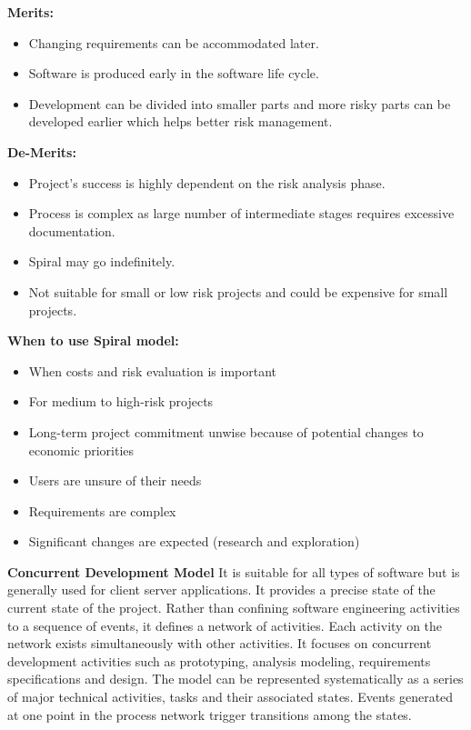 \documentclass{article}
\begin{document}
\textbf{Merits:}
\begin{itemize}
   \item 	Changing requirements can be accommodated later.
 \item 	Software is produced early in the software life cycle.
 \item 	Development can be divided into smaller parts and more risky parts can be developed earlier which helps better risk management.
\end{itemize}
\textbf{De-Merits:}
\begin{itemize}
 \item 	Project’s success is highly dependent on the risk analysis phase.
 \item 	Process is complex as large number of intermediate stages requires excessive documentation.
 \item 	Spiral may go indefinitely.
 \item 	Not suitable for small or low risk projects and could be expensive for small projects.
\end{itemize}

\textbf{ When to use Spiral model:}
 \begin{itemize}
 \item 	When costs and risk evaluation is important
 \item 	For medium to high-risk projects
 \item 	Long-term project commitment unwise because of potential changes to economic priorities
 \item 	Users are unsure of their needs
 \item 	Requirements are complex
 \item 	Significant changes are expected (research and exploration)


\end{itemize}
\vspace{0.5cm}

\large{\textbf{Concurrent Development Model}}
\vspace{0.2cm}
It is suitable for all types of software but is generally used for client server applications. It provides a precise state of the current state of the project. Rather than confining software engineering activities to a sequence of events, it defines a network of activities. Each activity on the network exists simultaneously with other activities. It focuses on concurrent development activities such as prototyping, analysis modeling, requirements specifications and design. The model can be represented systematically as a series of major technical activities, tasks and their associated states. Events generated at one point in the process network trigger transitions among the states.
\end{document}

